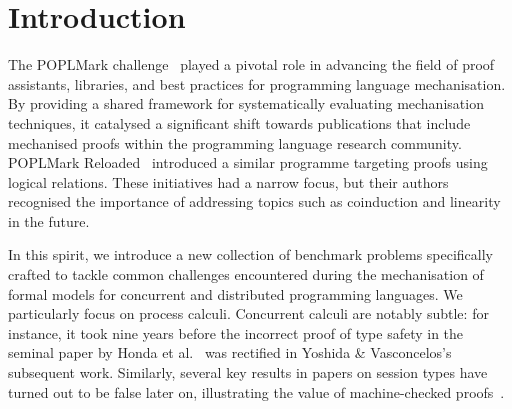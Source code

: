 \documentclass[runningheads]{llncs}
\begin{document}
\section{Introduction}
The POPLMark challenge~\cite{POPLMark}
played a pivotal role in advancing the field of proof assistants,
libraries, and best practices for programming language
mechanisation. By providing a shared framework for systematically
evaluating mechanisation techniques, it catalysed a significant
shift towards publications that include mechanised proofs within the programming language research community.
POPLMark Reloaded~\cite{POPLMarkReloaded} introduced a similar programme targeting proofs using logical relations.
These initiatives had a narrow focus, but their authors recognised the importance of addressing topics such as coinduction and linearity in the future.

In this spirit, we introduce a new collection of benchmark problems
specifically crafted to tackle common challenges encountered during
the mechanisation of formal models for concurrent and distributed
programming languages.
We particularly focus on process calculi.
Concurrent calculi are notably subtle: for instance, it took nine
years before the incorrect proof of type safety in the seminal paper
by Honda et al.~\cite{Honda1998} was rectified in Yoshida \&
Vasconcelos’s subsequent work\cite{Yoshida2007}.
Similarly, several key results in papers on session types have turned out
to be false later on, illustrating the
value of machine-checked proofs~\cite{Gay2020,10.1145/3290343}.
\end{document}
